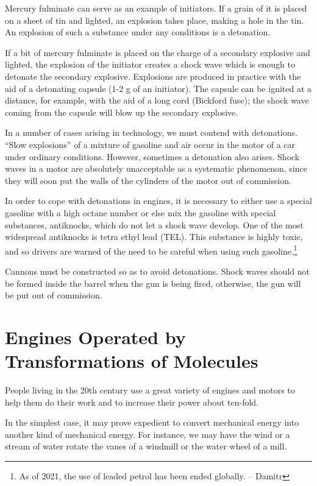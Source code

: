 Mercury fulminate can serve as an example of initia­tors. If a grain of it is placed on a sheet of tin and lighted, an explosion takes place, making a hole in the tin. An explosion of such a substance under any conditions is a detonation.

If a bit of mercury fulminate is placed on the charge of a secondary explosive and lighted, the explosion of the initiator creates a shock wave which is enough to deto­nate the secondary explosive. Explosions are produced in practice with the aid of a detonating capsule (1-2 \si{\gram} of an initiator). The capsule can be ignited at a distance, for example, with the aid of a long cord (Bickford fuse); the shock wave coming from the capsule will blow up the secondary explosive.

In a number of cases arising in technology, we must contend with detonations. ``Slow explosions'' of a mixture of gasoline and air occur in the motor of a car under ordi­nary conditions. However, sometimes a detonation also arises. Shock waves in a motor are absolutely unaccept­able as a systematic phenomenon, since they will soon put the walls of the cylinders of the motor out of commis­sion.

In order to cope with detonations in engines, it is nec­essary to either use a special gasoline with a high oc­tane number or else mix the gasoline with special substances, antiknocks, which do not let a shock wave de­velop. One of the most widespread antiknocks is tetra­ ethyl lead (TEL). This substance is highly toxic, and so drivers are warned of the need to be careful when using such gasoline.\footnote{As of 2021, the use of leaded petrol has been ended globally. -- Damitr}

Cannons must be constructed so as to avoid detona­tions. Shock waves should not be formed inside the barrel when the gun is being fired, otherwise, the gun will be put out of commission.

\section[Engines Operated by Transformations of Molecules]{Engines Operated by \\Transformations of Molecules}
People living in the 20th century use a great variety of engines and motors to help them do their work and to increase their power about ten-fold.

In the simplest case, it may prove expedient to convert mechanical energy into another kind of mechanical ener­gy. For instance, we may have the wind or a stream of water rotate the vanes of a windmill or the water wheel of a mill.

